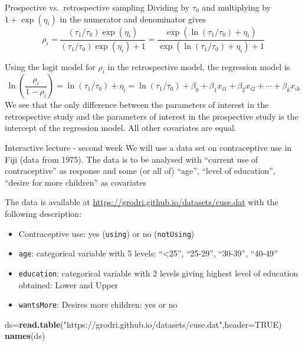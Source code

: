 \documentclass[
  ignorenonframetext,
]{beamer}
\newenvironment{Shaded}{\begin{snugshade}}{\end{snugshade}}
\newcommand{\AttributeTok}[1]{\textcolor[rgb]{0.13,0.29,0.53}{#1}}
\newcommand{\ConstantTok}[1]{\textcolor[rgb]{0.56,0.35,0.01}{#1}}
\newcommand{\FunctionTok}[1]{\textcolor[rgb]{0.13,0.29,0.53}{\textbf{#1}}}
\newcommand{\NormalTok}[1]{#1}
\newcommand{\OtherTok}[1]{\textcolor[rgb]{0.56,0.35,0.01}{#1}}
\newcommand{\StringTok}[1]{\textcolor[rgb]{0.31,0.60,0.02}{#1}}
\providecommand{\tightlist}{%
  \setlength{\itemsep}{0pt}\setlength{\parskip}{0pt}}
\begin{document}
\begin{frame}[fragile]{Prospective vs.~retrospective sampling}
Dividing by \(\tau_0\) and multiplying by \(1+\exp(\eta_i)\) in the
numerator and denominator gives
\[ \rho_i= \frac{(\tau_1/\tau_0) \exp(\eta_i)}{(\tau_1/\tau_0) \exp(\eta_i) + 1} = \frac{\exp(\ln(\tau_1/\tau_0) + \eta_i)}{\exp(\ln(\tau_1/\tau_0) + \eta_i) + 1}\]

Using the logit model for \(\rho_i\) in the retrospective model, the
regression model is
\[ \ln (\frac{\rho_i}{1-\rho_i}) = \ln(\tau_1/\tau_0) + \eta_i = \ln(\tau_1/\tau_0) + \beta_0+\beta_1 x_{i1}+\beta_2 x_{i2}+\cdots + \beta_k x_{ik} \]
We see that the only difference between the parameters of interest in
the retrospective study and the parameters of interest in the
prospective study is the intercept of the regression model. All other
covariates are equal.
\end{frame}

\begin{frame}[fragile]{Interactive lecture - second week}
\protect\hypertarget{interactive-lecture---second-week}{}
We will use a data set on contraceptive use in Fiji (data from 1975).
The data is to be analysed with ``current use of contraceptive'' as
response and some (or all of) ``age'', ``level of education'', ``desire
for more children'' as covariates

The data is available at
\url{https://grodri.github.io/datasets/cuse.dat} with the following
description:

\begin{itemize}
\tightlist
\item
  Contraceptive use: yes (\texttt{using}) or no (\texttt{notUsing})
\item
  \texttt{age}: categorical variable with 5 levels: ``\textless25'',
  ``25-29'', ``30-39'', ``40-49''
\item
  \texttt{education}: categorical variable with 2 levels giving highest
  level of education obtained: Lower and Upper
\item
  \texttt{wantsMore}: Desires more children: yes or no
\end{itemize}

\begin{Shaded}
\begin{Highlighting}[]
\NormalTok{ds}\OtherTok{=}\FunctionTok{read.table}\NormalTok{(}\StringTok{"https://grodri.github.io/datasets/cuse.dat"}\NormalTok{,}\AttributeTok{header=}\ConstantTok{TRUE}\NormalTok{)}
\FunctionTok{names}\NormalTok{(ds)}
\end{Highlighting}
\end{Shaded}


\end{frame}
\end{document}
